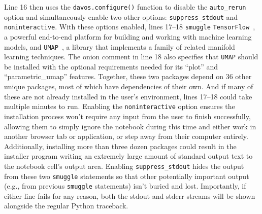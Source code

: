 \documentclass[preprint,12pt,a4paper]{elsarticle}
\begin{document}

Line 16 then uses the \texttt{davos.configure()} function to disable the \texttt{auto\_rerun} option and simultaneously enable two other options: \texttt{suppress\_stdout} and \texttt{noninteractive}. With these options enabled, lines 17--18 \texttt{smuggle} \texttt{TensorFlow}~\cite{AbadEtal15}, a powerful end-to-end platform for building and working with machine learning models, and \texttt{UMAP}~\cite{McInEtal18b}, a library that implements a family of related manifold learning techniques. The onion comment in line 18 also specifies that \texttt{UMAP} should be installed with the optional requirements needed for its ``plot'' and ``parametric\_umap'' features. Together, these two packages depend on 36 other unique packages, most of which have dependencies of their own. And if many of these are not already installed in the user's environment, lines 17--18 could take multiple minutes to run. Enabling the \texttt{noninteractive} option ensures the installation process won't require any input from the user to finish successfully, allowing them to simply ignore the notebook during this time and either work in another browser tab or application, or step away from their computer entirely. Additionally, installing more than three dozen packages could result in the installer program writing an extremely large amount of standard output text to the notebook cell's output area. Enabling \texttt{suppress\_stdout} hides the output from these two \texttt{smuggle} statements so that other potentially important output (e.g., from previous \texttt{smuggle} statements) isn't buried and lost. Importantly, if either line fails for any reason, both the stdout and stderr streams will be shown alongside the regular Python traceback.
\end{document}
